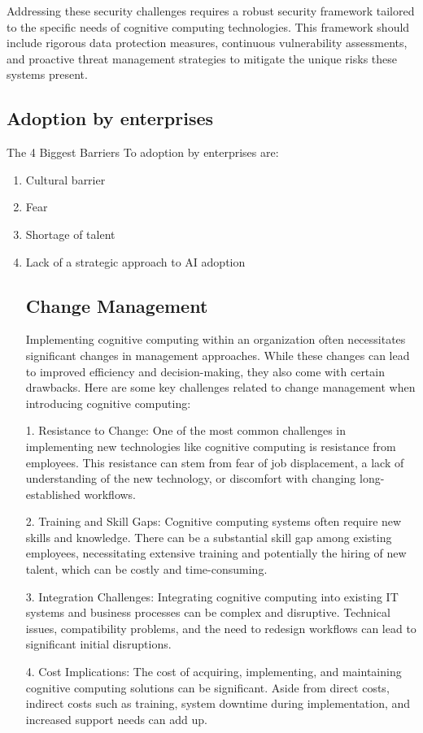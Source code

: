 \documentclass{article}
\begin{document}
Addressing these security challenges requires a robust security framework tailored to the specific needs of cognitive computing technologies. This framework should include rigorous data protection measures, continuous vulnerability assessments, and proactive threat management strategies to mitigate the unique risks these systems present.


\subsection{Adoption by enterprises}
The 4 Biggest Barriers To adoption by enterprises are:
\begin{enumerate}
	\item Cultural barrier 
	\item Fear
	\item Shortage of talent
	\item Lack of a strategic approach to AI adoption
\subsection{Change Management}
Implementing cognitive computing within an organization often necessitates significant changes in management approaches. While these changes can lead to improved efficiency and decision-making, they also come with certain drawbacks. Here are some key challenges related to change management when introducing cognitive computing:

1. Resistance to Change: One of the most common challenges in implementing new technologies like cognitive computing is resistance from employees. This resistance can stem from fear of job displacement, a lack of understanding of the new technology, or discomfort with changing long-established workflows.

2. Training and Skill Gaps: Cognitive computing systems often require new skills and knowledge. There can be a substantial skill gap among existing employees, necessitating extensive training and potentially the hiring of new talent, which can be costly and time-consuming.

3. Integration Challenges: Integrating cognitive computing into existing IT systems and business processes can be complex and disruptive. Technical issues, compatibility problems, and the need to redesign workflows can lead to significant initial disruptions.

4. Cost Implications: The cost of acquiring, implementing, and maintaining cognitive computing solutions can be significant. Aside from direct costs, indirect costs such as training, system downtime during implementation, and increased support needs can add up.


\end{enumerate}
\end{document}

